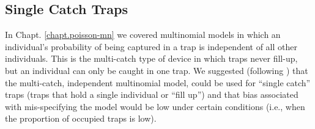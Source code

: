 \subsection{Single Catch Traps}

In Chapt. \ref{chapt.poisson-mn} we covered %
multinomial models in
which an individual's probability of being captured in a trap is
independent of all other individuals.
This is the multi-catch type of device in which traps
never fill-up, but an individual can only be caught in one trap. We
suggested (following \citet{efford_etal:2009euring}) that the
multi-catch, independent multinomial model, could be used for ``single
catch'' traps (traps that hold a single individual or ``fill up'') and
that bias associated with mis-specifying the model would be low under
certain conditions (i.e., when the proportion of occupied traps is
low).

